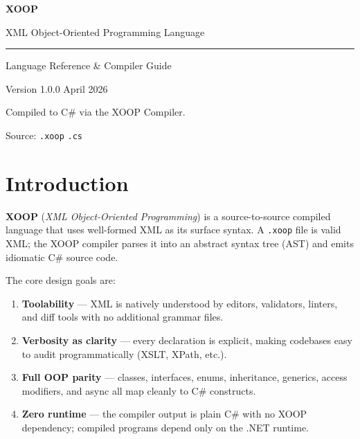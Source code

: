\documentclass[11pt,a4paper]{article}
\begin{document}
\begin{titlepage}
  \centering
  \vspace*{3cm}
  {\fontsize{48}{56}\selectfont\bfseries\color{xoop-blue} XOOP \par}
  \vspace{0.5em}
  {\Large\color{xoop-gray} XML Object-Oriented Programming Language \par}
  \vspace{2em}
  \rule{0.5\textwidth}{0.8pt} \par
  \vspace{1.5em}
  {\large Language Reference \& Compiler Guide \par}
  \vspace{0.5em}
  {\normalsize Version 1.0.0 \quad\textbullet\quad April 2026 \par}
  \vfill
  {\small Compiled to C\# via the XOOP Compiler. \par}
  {\small Source: \texttt{.xoop} \quad\textrightarrow\quad \texttt{.cs}}
\end{titlepage}

\tableofcontents
\newpage

\section{Introduction}

\textbf{XOOP} (\emph{XML Object-Oriented Programming}) is a source-to-source
compiled language that uses well-formed XML as its surface syntax.
A \texttt{.xoop} file is valid XML; the XOOP compiler parses it into an abstract
syntax tree (AST) and emits idiomatic C\# source code.

The core design goals are:

\begin{enumerate}[nosep]
  \item \textbf{Toolability} — XML is natively understood by editors, validators,
        linters, and diff tools with no additional grammar files.
  \item \textbf{Verbosity as clarity} — every declaration is explicit, making
        codebases easy to audit programmatically (XSLT, XPath, etc.).
  \item \textbf{Full OOP parity} — classes, interfaces, enums, inheritance,
        generics, access modifiers, and async all map cleanly to C\# constructs.
  \item \textbf{Zero runtime} — the compiler output is plain C\# with no XOOP
        dependency; compiled programs depend only on the .NET runtime.
\end{enumerate}
\end{document}
